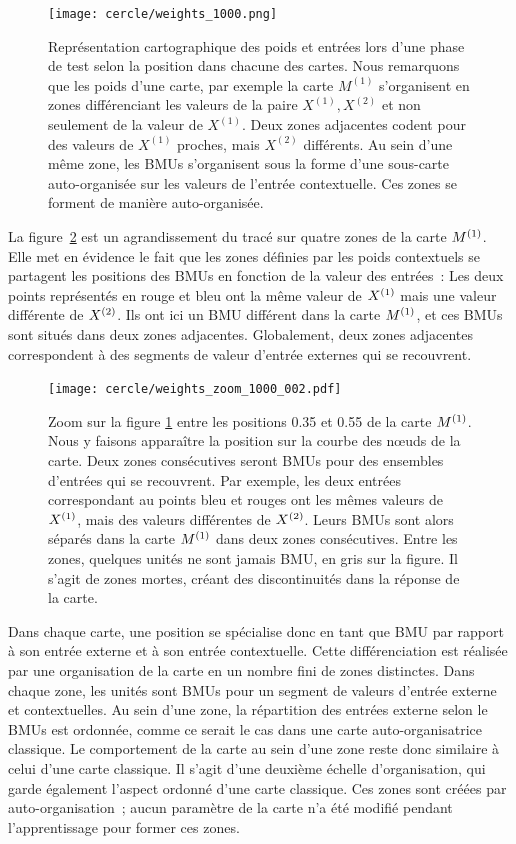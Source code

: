 \documentclass[../main]{subfiles}
\begin{document}
\begin{figure}[ht!]
	\centering\texttt{[image: cercle/weights\_1000.png]}
	\caption{Représentation cartographique des poids et entrées lors d'une phase de test selon la position dans chacune des cartes. Nous remarquons que les poids d'une carte, par exemple la carte $M^{(1)}$ s'organisent en zones différenciant les valeurs de la paire $X^{(1)}, X^{(2)}$ et non seulement de la valeur de $X^{(1)}$. Deux zones adjacentes codent pour des valeurs de $X^{(1)}$ proches, mais $X^{(2)}$ différents. Au sein d'une même zone, les BMUs s'organisent sous la forme d'une sous-carte auto-organisée sur les valeurs de l'entrée contextuelle. Ces zones se forment de manière auto-organisée. \label{fig:w}}
\end{figure}

La figure~\ref{fig:w_zoom} est un agrandissement du tracé sur quatre zones de la carte $M^{({1})}$.
Elle met en évidence le fait que les zones définies par les poids contextuels se partagent les positions des BMUs en fonction de la valeur des entrées~:
Les deux points représentés en rouge et bleu ont la même valeur de $X^{({1})}$ mais une valeur différente de $X^{({2})}$. 
Ils ont ici un BMU différent dans la carte $M^{({1})}$, et ces BMUs sont situés dans deux zones adjacentes.
Globalement, deux zones adjacentes correspondent à des segments de valeur d'entrée externes qui se recouvrent.

\begin{figure}[h!]
	\centering\texttt{[image: cercle/weights\_zoom\_1000\_002.pdf]}
   \caption{Zoom sur la figure \ref{fig:w} entre les positions 0.35 et 0.55 de la carte $M^{({1})}$. 
   Nous y faisons apparaître la position sur la courbe des n\oe{}uds de la carte.
   Deux zones consécutives seront BMUs pour des ensembles d'entrées qui se recouvrent. Par exemple, les deux entrées correspondant au points bleu et rouges ont les mêmes valeurs de $X^{({1})}$, mais des valeurs différentes de $X^{({2})}$. Leurs BMUs sont alors séparés dans la carte $M^{({1})}$ dans deux zones consécutives.
   Entre les zones, quelques unités ne sont jamais BMU, en gris sur la figure. Il s'agit de zones mortes, créant des discontinuités dans la réponse de la carte.
   \label{fig:w_zoom}}
\end{figure}

Dans chaque carte, une position se spécialise donc en tant que BMU par rapport à son entrée externe et à son entrée contextuelle.
Cette différenciation est réalisée par une organisation de la carte en un nombre fini de zones distinctes. Dans chaque zone, les unités sont BMUs pour un segment de valeurs d'entrée externe et contextuelles. Au sein d'une zone, la répartition des entrées externe selon le BMUs est ordonnée, comme ce serait le cas dans une carte auto-organisatrice classique. Le comportement de la carte au sein d'une zone reste donc similaire à celui d'une carte classique.
Il s'agit d'une deuxième échelle d'organisation, qui garde également l'aspect ordonné d'une carte classique. 
Ces zones sont créées par auto-organisation~; aucun paramètre de la carte n'a été modifié pendant l'apprentissage pour former ces zones.
\end{document}
